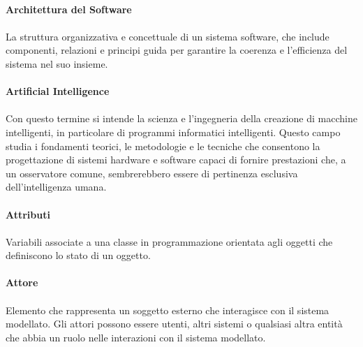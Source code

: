 \documentclass[10pt, a4paper]{article}
\begin{document}
\vspace{2em}
\paragraph{Architettura del Software}\noindent\hrulefill
\paragraph{}La struttura organizzativa e concettuale di un sistema software, che include componenti, relazioni e principi guida per garantire la coerenza e l'efficienza del sistema nel suo insieme.



\vspace{2em}
\paragraph{Artificial Intelligence}\noindent\hrulefill
\paragraph{}Con questo termine si intende la scienza e l’ingegneria della creazione di macchine intelligenti, in particolare di programmi informatici intelligenti. Questo campo studia i fondamenti teorici, le metodologie e le tecniche che consentono la progettazione di sistemi hardware e software capaci di fornire prestazioni che, a un osservatore comune, sembrerebbero essere di pertinenza esclusiva dell’intelligenza umana.

\vspace{2em}
\paragraph{Attributi}\noindent\hrulefill
\paragraph{}Variabili associate a una classe in programmazione orientata agli oggetti che definiscono lo stato di un oggetto.


\vspace{2em}
\paragraph{Attore}\noindent\hrulefill
\paragraph{}Elemento che rappresenta un soggetto esterno che interagisce con il sistema modellato. Gli attori possono essere utenti, altri sistemi o qualsiasi altra entità che abbia un ruolo nelle interazioni con il sistema modellato.
\end{document}
